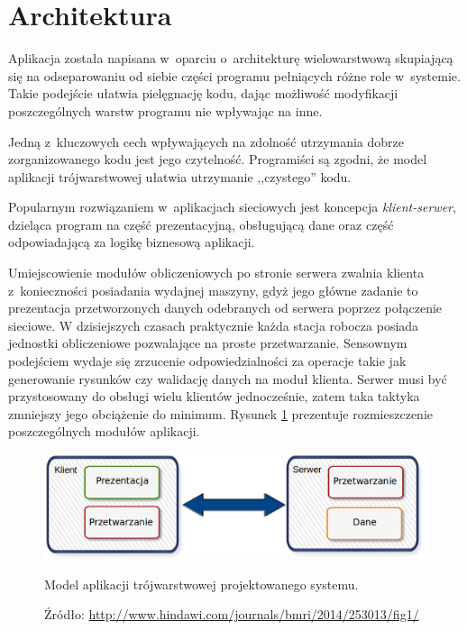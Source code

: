 \documentclass[a4paper,12pt,oneside]{mwrep}  %
\begin{document}
\section{Architektura}

Aplikacja została napisana w~oparciu o~architekturę wielowarstwową skupiającą się na odseparowaniu od siebie części programu pełniących różne role w~systemie. Takie podejście ułatwia pielęgnację kodu, dając możliwość modyfikacji poszczególnych warstw programu nie wpływając na inne. 

Jedną z~kluczowych cech wpływających na zdolność utrzymania dobrze zorganizowanego kodu jest jego czytelność. Programiści są zgodni, że model aplikacji trójwarstwowej ułatwia utrzymanie ,,czystego'' kodu.

Popularnym rozwiązaniem w~aplikacjach sieciowych jest koncepcja \emph{klient-serwer}, dzieląca program na część prezentacyjną, obsługującą dane oraz część odpowiadającą za logikę biznesową aplikacji.

Umiejscowienie modułów obliczeniowych po stronie serwera zwalnia klienta z~konieczności posiadania wydajnej maszyny, gdyż jego główne zadanie to prezentacja przetworzonych danych odebranych od serwera poprzez połączenie sieciowe. 
W dzisiejszych czasach praktycznie każda stacja robocza posiada jednostki obliczeniowe pozwalające na proste przetwarzanie. Sensownym podejściem wydaje się zrzucenie odpowiedzialności za operacje takie jak generowanie rysunków czy walidację danych na moduł klienta. Serwer musi być przystosowany do obsługi wielu klientów jednocześnie, zatem taka taktyka zmniejszy jego obciążenie do minimum. Rysunek \ref{klient-serwer} prezentuje rozmieszczenie poszczególnych modułów aplikacji.

\begin{figure}[h]
\centering
\includegraphics[width=1\textwidth]{grafika/klient_server/final_klient_serwer_poziomo.png}
\caption{Model aplikacji trójwarstwowej projektowanego systemu.}
\vspace{-0.8cm}
\caption*{\scriptsize Źródło: \url{http://www.hindawi.com/journals/bmri/2014/253013/fig1/}}
\label{klient-serwer}
\end{figure}
\end{document}
